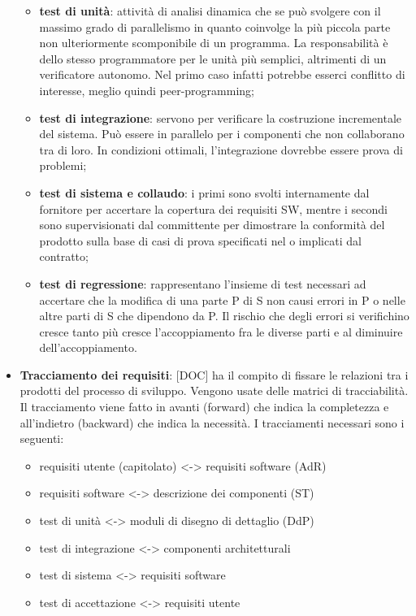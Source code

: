 \begin{itemize}
			\begin{itemize}
				\item \textbf{test di unità}: attività di analisi dinamica che se può svolgere con il massimo grado di parallelismo in quanto coinvolge la più piccola parte non ulteriormente scomponibile di un programma. La responsabilità è dello stesso programmatore per le unità più semplici, altrimenti di un verificatore autonomo. Nel primo caso infatti potrebbe esserci conflitto di interesse, meglio quindi peer-programming;
				\item \textbf{test di integrazione}: servono per verificare la costruzione incrementale del sistema. Può essere in parallelo per i componenti che non collaborano tra di loro. In condizioni ottimali, l'integrazione dovrebbe essere prova di problemi;
				\item \textbf{test di sistema e collaudo}: i primi sono svolti internamente dal fornitore per accertare la copertura dei requisiti SW, mentre i secondi sono supervisionati dal committente per dimostrare la conformità del prodotto sulla base di casi di prova specificati nel o implicati dal contratto;
				\item \textbf{test di regressione}: rappresentano l'insieme di test necessari ad accertare che la modifica di una parte P di S non causi errori in P o nelle altre parti di S che dipendono da P. Il rischio che degli errori si verifichino cresce tanto più cresce l'accoppiamento fra le diverse parti e al diminuire dell'accoppiamento.

			\end{itemize}







		\item \textbf{Tracciamento dei requisiti}: [DOC] ha il compito di fissare le relazioni tra i prodotti del processo di sviluppo. Vengono usate delle matrici di tracciabilità. Il tracciamento viene fatto in avanti (forward) che indica la completezza e all'indietro (backward) che indica la necessità. I tracciamenti necessari sono i seguenti:
			\begin{itemize}
				\item requisiti utente (capitolato) <-> requisiti software (AdR)
				\item requisiti software <-> descrizione dei componenti (ST)
				\item test di unità <-> moduli di disegno di dettaglio (DdP)
				\item test di integrazione <-> componenti architetturali
				\item test di sistema <-> requisiti software
				\item test di accettazione <-> requisiti utente
			\end{itemize}

	\end{itemize}
